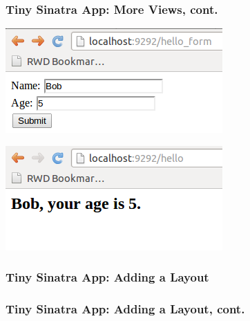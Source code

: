 \documentclass{beamer}
\begin{document}
\begin{frame}[fragile]\frametitle{Tiny Sinatra App: More Views, cont.}
  
  \begin{center}
    \includegraphics[scale=.5]{images/hello_form2.png} 
  \end{center}

  \begin{center}
    \includegraphics[scale=.5]{images/hello_from_post2.png}  
  \end{center}  

\end{frame}



\begin{frame}[fragile]\frametitle{Tiny Sinatra App: Adding a Layout}
  
  

  

\end{frame}





\begin{frame}[fragile]\frametitle{Tiny Sinatra App: Adding a Layout, cont.}

  
  
  

  

\end{frame}
\end{document}
